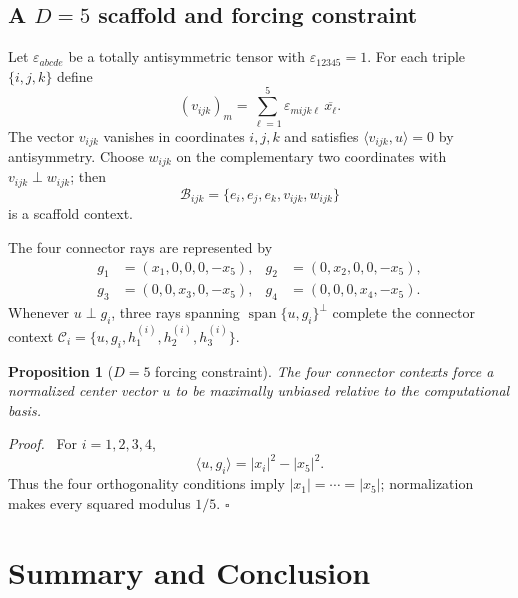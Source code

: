 \documentclass[%
  reprint,
  superscriptaddress,
  showpacs,
  showkeys,
  amsmath,amssymb,
  pra,
  longbibliography,
  floatfix,
  x11names
]{revtex4-2}
\newenvironment{revision}{\begingroup}{\endgroup}
\newtheorem{proposition}{Proposition}
\newenvironment{proof}{\par\noindent\textit{Proof.}\ }{\hfill$\square$\par}
\begin{document}
\begin{revision}
\subsection{A $D=5$ scaffold and forcing constraint}

Let $\varepsilon_{abcde}$ be a totally antisymmetric tensor
with $\varepsilon_{12345}=1$.  For each triple $\{i,j,k\}$ define
\[
(v_{ijk})_m=\sum_{\ell=1}^5\varepsilon_{mijk\ell}\,\overline{x_\ell}.
\]
The vector $v_{ijk}$ vanishes in coordinates $i,j,k$ and satisfies $\langle v_{ijk},u\rangle=0$ by antisymmetry.  Choose $w_{ijk}$ on the complementary two coordinates with $v_{ijk}\perp w_{ijk}$; then
\[
\mathcal{B}_{ijk}=\{e_i,e_j,e_k,v_{ijk},w_{ijk}\}
\]
is a scaffold context.

The four connector rays are represented by
\begin{align*}
g_1&=(x_1,0,0,0,-x_5),&
g_2&=(0,x_2,0,0,-x_5),\\
g_3&=(0,0,x_3,0,-x_5),&
g_4&=(0,0,0,x_4,-x_5).
\end{align*}
Whenever $u\perp g_i$, three rays spanning $\operatorname{span}\{u,g_i\}^{\perp}$ complete the connector context $\mathcal{C}_i=\{u,g_i,h^{(i)}_1,h^{(i)}_2,h^{(i)}_3\}$.

\begin{proposition}[$D=5$ forcing constraint]
\label{prop:D5forcing}
The four connector contexts force a normalized center vector $u$ to be maximally unbiased relative to the computational basis.
\end{proposition}

\begin{proof}
For $i=1,2,3,4$,
\[
\langle u,g_i\rangle=|x_i|^2-|x_5|^2.
\]
Thus the four orthogonality conditions imply \ensuremath{|x_1|=\cdots=|x_5|};
normalization makes every squared modulus $1/5$.
\end{proof}
\end{revision}

\section{Summary and Conclusion}

\end{document}
